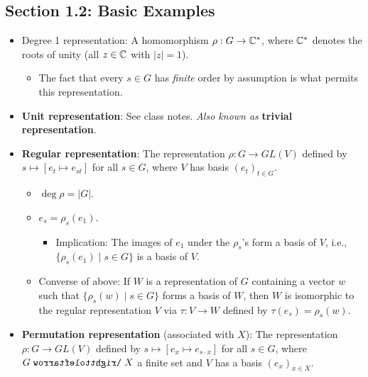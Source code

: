 \documentclass[../notes.tex]{subfiles}
\begin{document}
\subsection*{Section 1.2: Basic Examples}
\begin{itemize}
    \item Degree 1 representation: A homomorphism $\rho:G\to\mathbb{C}^*$, where $\mathbb{C}^*$ denotes the roots of unity (all $z\in\mathbb{C}$ with $|z|=1$).
    \begin{itemize}
        \item The fact that every $s\in G$ has \emph{finite} order by assumption is what permits this representation.
    \end{itemize}
    \item \textbf{Unit representation}: See class notes. \emph{Also known as} \textbf{trivial representation}.
    \item \textbf{Regular representation}: The representation $\rho:G\to GL(V)$ defined by $s\mapsto[e_t\mapsto e_{st}]$ for all $s\in G$, where $V$ has basis $(e_t)_{t\in G}$.
    \begin{itemize}
        \item $\deg\rho=|G|$.
        \item $e_s=\rho_s(e_1)$.
        \begin{itemize}
            \item Implication: The images of $e_1$ under the $\rho_s$'s form a basis of $V$, i.e., $\{\rho_s(e_1)\mid s\in G\}$ is a basis of $V$.
        \end{itemize}
        \item Converse of above: If $W$ is a representation of $G$ containing a vector $w$ such that $\{\rho_s(w)\mid s\in G\}$ forms a basis of $W$, then $W$ is isomorphic to the regular representation $V$ via $\tau:V\to W$ defined by $\tau(e_s)=\rho_s(w)$.
    \end{itemize}
    \item \textbf{Permutation representation} (associated with $X$): The representation $\rho:G\to GL(V)$ defined by $s\mapsto[e_x\mapsto e_{s\cdot x}]$ for all $s\in G$, where $G\acts X$ a finite set and $V$ has a basis $(e_x)_{x\in X}$.
\end{itemize}
\end{document}
